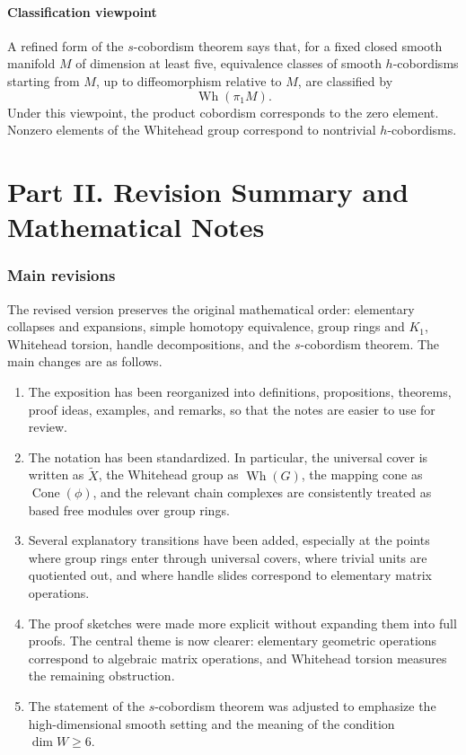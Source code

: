 \documentclass[11pt,a4paper]{article}
\newcommand{\Wh}{\operatorname{Wh}}
\newcommand{\Cone}{\operatorname{Cone}}
\theoremstyle{definition}
\theoremstyle{plain}
\theoremstyle{remark}
\begin{document}
\subsection{Classification viewpoint}

A refined form of the \(s\)-cobordism theorem says that, for a fixed closed smooth manifold \(M\) of dimension at least five, equivalence classes of smooth \(h\)-cobordisms starting from \(M\), up to diffeomorphism relative to \(M\), are classified by
\[
  \Wh(\pi_1M).
\]
Under this viewpoint, the product cobordism corresponds to the zero element. Nonzero elements of the Whitehead group correspond to nontrivial \(h\)-cobordisms.

\newpage
\part*{Part II. Revision Summary and Mathematical Notes}

\section*{Main revisions}

The revised version preserves the original mathematical order: elementary collapses and expansions, simple homotopy equivalence, group rings and \(K_1\), Whitehead torsion, handle decompositions, and the \(s\)-cobordism theorem. The main changes are as follows.

\begin{enumerate}
  \item The exposition has been reorganized into definitions, propositions, theorems, proof ideas, examples, and remarks, so that the notes are easier to use for review.
  \item The notation has been standardized. In particular, the universal cover is written as \(\widetilde X\), the Whitehead group as \(\Wh(G)\), the mapping cone as \(\Cone(\phi)\), and the relevant chain complexes are consistently treated as based free modules over group rings.
  \item Several explanatory transitions have been added, especially at the points where group rings enter through universal covers, where trivial units are quotiented out, and where handle slides correspond to elementary matrix operations.
  \item The proof sketches were made more explicit without expanding them into full proofs. The central theme is now clearer: elementary geometric operations correspond to algebraic matrix operations, and Whitehead torsion measures the remaining obstruction.
  \item The statement of the \(s\)-cobordism theorem was adjusted to emphasize the high-dimensional smooth setting and the meaning of the condition \(\dim W\ge 6\).
\end{enumerate}
\end{document}
